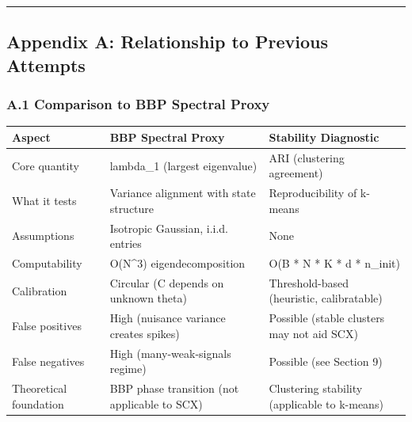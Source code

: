 \documentclass[
  12pt,
]{article}
\begin{document}
\begin{center}\rule{0.5\linewidth}{0.5pt}\end{center}

\subsection{Appendix A: Relationship to Previous
Attempts}\label{appendix-a-relationship-to-previous-attempts}

\subsubsection{A.1 Comparison to BBP Spectral
Proxy}\label{a.1-comparison-to-bbp-spectral-proxy}

\begin{longtable}[]{@{}
  >{\raggedright\arraybackslash}p{}
  >{\raggedright\arraybackslash}p{}
  >{\raggedright\arraybackslash}p{}@{}}
\toprule\noalign{}
\begin{minipage}[b]{\linewidth}\raggedright
Aspect
\end{minipage} & \begin{minipage}[b]{\linewidth}\raggedright
BBP Spectral Proxy
\end{minipage} & \begin{minipage}[b]{\linewidth}\raggedright
Stability Diagnostic
\end{minipage} \\
\midrule\noalign{}
\endhead
\bottomrule\noalign{}
\endlastfoot
Core quantity & lambda\_1 (largest eigenvalue) & ARI (clustering
agreement) \\
What it tests & Variance alignment with state structure &
Reproducibility of k-means \\
Assumptions & Isotropic Gaussian, i.i.d. entries & None \\
Computability & O(N\^{}3) eigendecomposition & O(B * N * K * d *
n\_init) \\
Calibration & Circular (C depends on unknown theta) & Threshold-based
(heuristic, calibratable) \\
False positives & High (nuisance variance creates spikes) & Possible
(stable clusters may not aid SCX) \\
False negatives & High (many-weak-signals regime) & Possible (see
Section 9) \\
Theoretical foundation & BBP phase transition (not applicable to SCX) &
Clustering stability (applicable to k-means) \\
\end{longtable}
\end{document}
